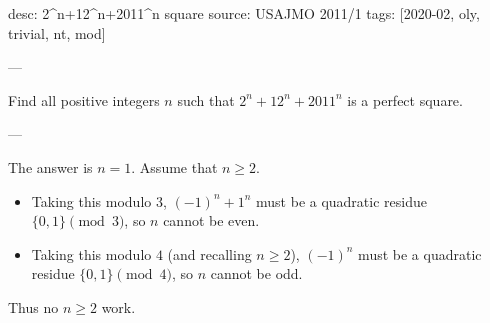 desc: 2^n+12^n+2011^n square
source: USAJMO 2011/1
tags: [2020-02, oly, trivial, nt, mod]

---

Find all positive integers $n$ such that $2^n+12^n+2011^n$ is a perfect square.

---

The answer is $n=1$. Assume that $n\ge2$.
\begin{itemize}
    \item Taking this modulo $3$, $(-1)^n+1^n$ must be a quadratic residue $\{0,1\}\pmod3$, so $n$ cannot be even.
    \item Taking this modulo $4$ (and recalling $n\ge2$), $(-1)^n$ must be a quadratic residue $\{0,1\}\pmod4$, so $n$ cannot be odd.
\end{itemize}
Thus no $n\ge2$ work.
